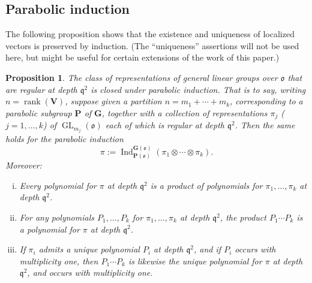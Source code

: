 \documentclass[reqno]{amsart}
\DeclareMathOperator{\GL}{GL}
\DeclareMathOperator{\rank}{rank}
\DeclareMathOperator{\Ind}{Ind}
\theoremstyle{plain} \newtheorem{theorem} {Theorem} \newtheorem{conjecture} {Conjecture} \newtheorem{corollary} [theorem] {Corollary} \newtheorem{proposition} [theorem] {Proposition} \newtheorem{fact} [theorem] {Fact}
\theoremstyle{definition} \newtheorem{definition} [theorem] {Definition}
\theoremstyle{itplain} %
\newcommand{\mfq}{\mathfrak{q}}
\begin{document}
\subsection{Parabolic induction}\label{sec:cj3m0c6a7b}
The following proposition shows that the existence and uniqueness of localized vectors is preserved by induction.  (The ``uniqueness'' assertions will not be used here, but might be useful for certain extensions of the work of this paper.)
\begin{proposition}\label{proposition:regular-stable-closed-under-parabolic-induction}
  The class of representations of general linear groups over $\mathfrak{o}$ that are regular at depth $\mfq^2$ is closed under parabolic induction.  That is to say, writing $n = \rank(\mathbf{V})$, suppose given a partition $n = m_1 + \dotsb + m_k$, corresponding to a parabolic subgroup $\mathbf{P}$ of $\mathbf{G}$, together with a collection of representations $\pi_j$ ($j = 1, \dotsc, k$) of $\GL_{m_j}(\mathfrak{o})$ each of which is regular at depth $\mfq^2$.  Then the same holds for the parabolic induction
  \begin{equation*}
    \pi := \Ind_{\mathbf{P}(\mathfrak{o})}^{\mathbf{G}(\mathfrak{o})}(\pi_1 \otimes \dotsb \otimes \pi_k).
  \end{equation*}
  Moreover:
  \begin{enumerate}[(i)]
  \item Every polynomial for $\pi$ at depth $\mfq^2$ is a product of polynomials for $\pi_1,\dotsc,\pi_k$ at depth $\mfq^2$.
  \item For any polynomials $P_1,\dotsc,P_k$ for $\pi_1,\dotsc,\pi_k$ at depth $\mfq^2$, the product $P_1 \dotsm P_k$ is a polynomial for $\pi$ at depth $\mfq^2$.
  \item If $\pi_i$ admits a unique polynomial $P_i$ at depth $\mfq^2$, and if $P_i$ occurs with multiplicity one, then $P_1 \dotsb P_k$ is likewise the unique polynomial for $\pi$ at depth $\mfq^2$, and occurs with multiplicity one.
  \end{enumerate}
\end{proposition}
\end{document}
